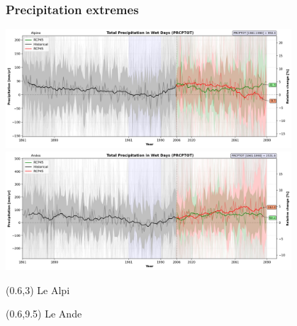 
\begin{frame}
\frametitle{Precipitation extremes}
\begin{center}

{\includegraphics[width=0.8\textwidth]{risultati/prcptot_Alpine_Models_ts}}
{\includegraphics[width=0.8\textwidth]{risultati/prcptot_Andes_Models_ts}}
\end{center}

{
  \scriptsize
  \begin{textblock}{1.8}(0.6,3)
     {\color{gray} Le Alpi}
  \end{textblock}
}


{
  \scriptsize
  \begin{textblock}{1.8}(0.6,9.5)
     {\color{gray} Le Ande}
  \end{textblock}
}

\end{frame}

%
